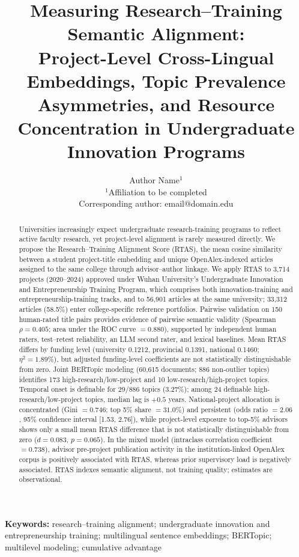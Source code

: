 \documentclass[11pt]{article}
\title{\textbf{Measuring Research--Training Semantic Alignment:}\\
Project-Level Cross-Lingual Embeddings, Topic Prevalence Asymmetries, and Resource Concentration in Undergraduate Innovation Programs}
\author{
Author Name$^{1}$\\
\small $^{1}$Affiliation to be completed\\
\small Corresponding author: email@domain.edu
}
\date{}
\begin{document}
\maketitle

\begin{abstract}
Universities increasingly expect undergraduate research-training programs to reflect active faculty research, yet project-level alignment is rarely measured directly. We propose the Research--Training Alignment Score (RTAS), the mean cosine similarity between a student project-title embedding and unique OpenAlex-indexed articles assigned to the same college through advisor--author linkage. We apply RTAS to 3,714 projects (2020--2024) approved under Wuhan University's Undergraduate Innovation and Entrepreneurship Training Program, which comprises both innovation-training and entrepreneurship-training tracks, and to 56,901 articles at the same university; 33,312 articles (58.5\%) enter college-specific reference portfolios. Pairwise validation on 150 human-rated title pairs provides evidence of pairwise semantic validity (Spearman $\rho=0.405$; area under the ROC curve $=0.880$), supported by independent human raters, test--retest reliability, an LLM second rater, and lexical baselines. Mean RTAS differs by funding level (university 0.1212, provincial 0.1391, national 0.1460; $\eta^2=1.89\%$), but adjusted funding-level coefficients are not statistically distinguishable from zero. Joint BERTopic modeling (60,615 documents; 886 non-outlier topics) identifies 173 high-research/low-project and 10 low-research/high-project topics. Temporal onset is definable for 29/886 topics (3.27\%); among 24 definable high-research/low-project topics, median lag is $+0.5$ years. National-project allocation is concentrated (Gini $=0.746$; top 5\% share $=31.0\%$) and persistent (odds ratio $=2.06$, 95\% confidence interval [1.53, 2.76]), while project-level exposure to top-5\% advisors shows only a small mean RTAS difference that is not statistically distinguishable from zero ($d=0.083$, $p=0.065$). In the mixed model (intraclass correlation coefficient $=0.738$), advisor pre-project publication activity in the institution-linked OpenAlex corpus is positively associated with RTAS, whereas prior supervisory load is negatively associated. RTAS indexes semantic alignment, not training quality; estimates are observational.
\end{abstract}

\noindent\textbf{Keywords:} research--training alignment; undergraduate innovation and entrepreneurship training; multilingual sentence embeddings; BERTopic; multilevel modeling; cumulative advantage
\end{document}
